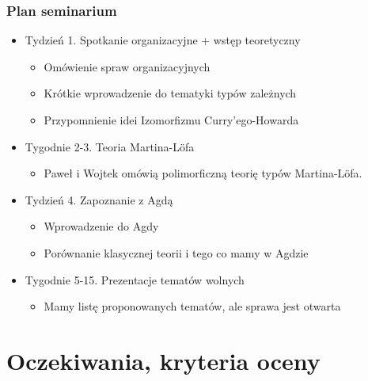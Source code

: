 \documentclass{beamer}
\begin{document}
\begin{frame}

\frametitle{Plan seminarium}

\begin{itemize}

\item Tydzień 1. Spotkanie organizacyjne + wstęp teoretyczny

\begin{itemize}
\item <2-4> Omówienie spraw organizacyjnych
\item <3-4> Krótkie wprowadzenie do tematyki typów zależnych 
\item <4-4> Przypomnienie idei Izomorfizmu Curry'ego-Howarda
\end{itemize}

\item Tygodnie 2-3. Teoria Martina-L\"{o}fa

\begin{itemize}
\item <5-5> Paweł i Wojtek omówią polimorficzną teorię typów Martina-L\"{o}fa.
\end{itemize}

\item Tydzień 4. Zapoznanie z Agdą

\begin{itemize}
\item <6-7> Wprowadzenie do Agdy
\item <7-7> Porównanie klasycznej teorii i tego co mamy w Agdzie
\end{itemize}

\item Tygodnie 5-15. Prezentacje tematów wolnych
\begin{itemize}
\item <8-> Mamy listę proponowanych tematów, ale sprawa jest otwarta
\end{itemize}

\end{itemize}

\end{frame}



\section{Oczekiwania, kryteria oceny}
\end{document}
